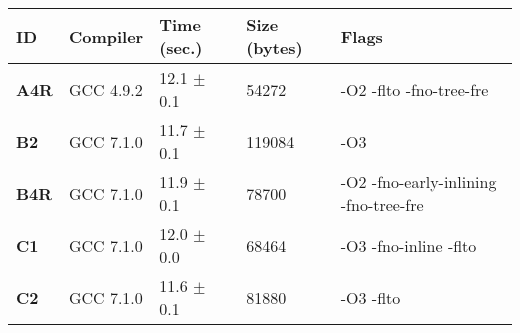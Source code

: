     \begin{tabular}{|l|l|l|l|p{3.2in}|}
     \hline
      \textbf{ID} & \textbf{Compiler} & \textbf{Time (sec.)} & \textbf{Size (bytes)} & \textbf{Flags} \\ 
     \hline
      \textbf{ A4R } &  GCC 4.9.2  &  12.1 $\pm$ 0.1  &  54272  & {\small -O2 -flto -fno-tree-fre }\\
     \hline
      \textbf{ B2 } &  GCC 7.1.0  &  11.7 $\pm$ 0.1  &  119084  & {\small -O3 }\\
     \hline
      \textbf{ B4R } &  GCC 7.1.0  &  11.9 $\pm$ 0.1  &  78700  & {\small -O2 -fno-early-inlining -fno-tree-fre }\\
     \hline
      \textbf{ C1 } &  GCC 7.1.0  &  12.0 $\pm$ 0.0  &  68464  & {\small -O3 -fno-inline -flto }\\
     \hline
      \textbf{ C2 } &  GCC 7.1.0  &  11.6 $\pm$ 0.1  &  81880  & {\small -O3 -flto }\\
     \hline
    \end{tabular}    